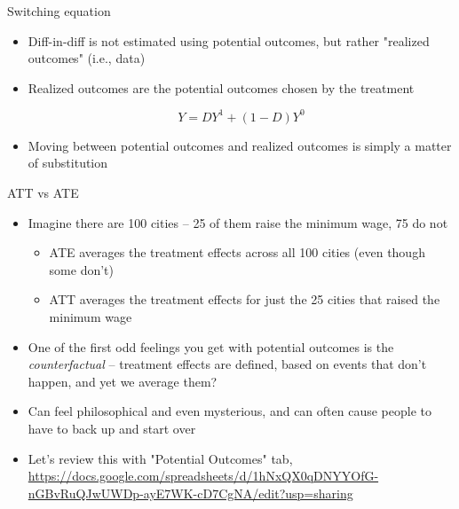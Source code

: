 \documentclass{beamer}
\begin{document}
\begin{frame}{Switching equation}

\begin{itemize}
\item Diff-in-diff is not estimated using potential outcomes, but rather "realized outcomes" (i.e., data)
\item Realized outcomes are the potential outcomes chosen by the treatment 

$$Y=D Y^1 + (1-D) Y^0$$

\item Moving between potential outcomes and realized outcomes is simply a matter of substitution 
\end{itemize}

\end{frame}


\begin{frame}{ATT vs ATE}

\begin{itemize}
\item Imagine there are 100 cities -- 25 of them raise the minimum wage, 75 do not
	\begin{itemize}
	\item ATE averages the treatment effects across all 100 cities (even though some don't)
	\item ATT averages the treatment effects for just the 25 cities that raised the minimum wage
	\end{itemize}
\item One of the first odd feelings you get with potential outcomes is the \emph{counterfactual} -- treatment effects are defined, based on events that don't happen, and yet we average them?
\item Can feel philosophical and even mysterious, and can often cause people to have to back up and start over
\item Let's review this with "Potential Outcomes" tab, \url{https://docs.google.com/spreadsheets/d/1hNxQX0qDNYYOfG-nGBvRuQJwUWDp-ayE7WK-cD7CgNA/edit?usp=sharing}
\end{itemize}

\end{frame}
\end{document}
